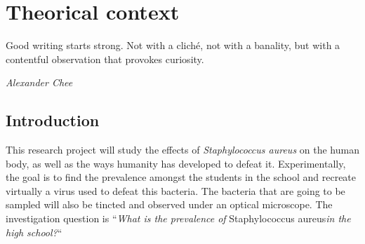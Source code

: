 \chapter{Theorical context}
\epigraph{Good writing starts strong. Not with a cliché, not with a banality, but with a contentful observation that provokes curiosity.}{\textit{Alexander Chee}}
\section{Introduction}
This research project will study the effects of \emph{Staphylococcus aureus} on the human body, as well as the ways humanity has developed to defeat it. Experimentally, the goal is to find the prevalence amongst the students in the school and recreate virtually a virus used to defeat this bacteria. The bacteria that are going to be sampled will also be tincted and observed under an optical microscope.\newline
The investigation question is ``\emph{What is the prevalence of} Staphylococcus aureus\emph{in the high school?}``
